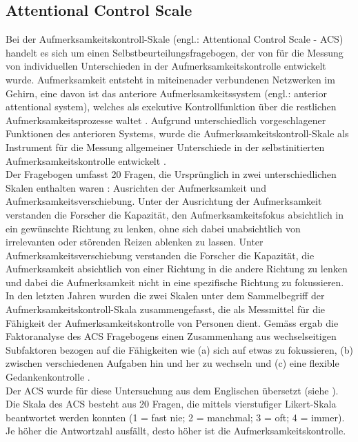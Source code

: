 \subsection{Attentional Control Scale} \label{subsection.acs}
Bei der Aufmerksamkeitskontroll-Skale (engl.: Attentional Control Scale - ACS) handelt es sich um einen Selbstbeurteilungsfragebogen, der von  für die Messung von individuellen Unterschieden in der Aufmerksamkeitskontrolle entwickelt wurde. Aufmerksamkeit entsteht in miteinenader verbundenen Netzwerken im Gehirn, eine davon ist das anteriore Aufmerksamkeitssystem (engl.: anterior attentional system), welches als exekutive Kontrollfunktion über die restlichen Aufmerksamkeitsprozesse waltet \cite{Posner1998}. Aufgrund unterschiedlich vorgeschlagener Funktionen des anterioren Systems, wurde die Aufmerksamkeitskontroll-Skale als Instrument für die Messung allgemeiner Unterschiede in der selbstinitierten Aufmerksamkeitskontrolle entwickelt \cite{Derryberry2001}.\\
Der Fragebogen umfasst 20 Fragen, die Ursprünglich in zwei unterschiedlichen Skalen enthalten waren \cite{Derryberry1988}: Ausrichten der Aufmerksamkeit und Aufmerksamkeitsverschiebung. Unter der Ausrichtung der Aufmerksamkeit verstanden die Forscher die Kapazität, den Aufmerksamkeitsfokus absichtlich in ein gewünschte Richtung zu lenken, ohne sich dabei unabsichtlich von irrelevanten oder störenden Reizen ablenken zu lassen. Unter Aufmerksamkeitsverschiebung verstanden die Forscher die Kapazität, die Aufmerksamkeit absichtlich von einer Richtung in die andere Richtung zu lenken und dabei die Aufmerksamkeit nicht in eine spezifische Richtung zu fokussieren. In den letzten Jahren wurden die zwei Skalen unter dem Sammelbegriff der Aufmerksamkeitskontroll-Skala zusammengefasst, die als Messmittel für die Fähigkeit der Aufmerksamkeitskontrolle von Personen dient. Gemäss  ergab die Faktoranalyse des ACS Fragebogens einen Zusammenhang aus wechselseitigen Subfaktoren bezogen auf die Fähigkeiten wie (a) sich auf etwas zu fokussieren, (b) zwischen verschiedenen Aufgaben hin und her zu wechseln und (c) eine flexible Gedankenkontrolle \cite[S.~226]{Derryberry2002}. \\
Der ACS wurde für diese Untersuchung aus dem Englischen übersetzt (siehe ). Die Skala des ACS besteht aus 20 Fragen, die mittels vierstufiger Likert-Skala beantwortet werden konnten (1 = fast nie; 2 = manchmal; 3 = oft; 4 = immer). Je höher die Antwortzahl ausfällt, desto höher ist die Aufmerksamkeitskontrolle.

